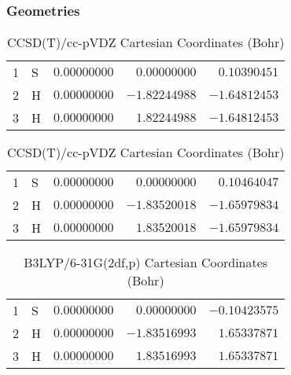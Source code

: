 \documentclass[10pt,oneside]{article}
\begin{document}
\clearpage

\subsection{}

\begin{table}[h!]
\subsubsection*{Geometries}
\begin{multicols}{2}
\centering
\caption{CCSD(T)/cc-pVTZ Cartesian Coordinates (Bohr)}
\begin{tabular}{llrrr}
\toprule
1  & S  & $ 0.00000000$ & $ 0.00000000$ & $ 0.10390451$ \\
2  & H  & $ 0.00000000$ & $-1.82244988$ & $-1.64812453$ \\
3  & H  & $ 0.00000000$ & $ 1.82244988$ & $-1.64812453$ \\
\bottomrule
\end{tabular}
\caption{CCSD(T)/cc-pVDZ Cartesian Coordinates (Bohr)}
\begin{tabular}{llrrr}
\toprule
1  & S  & $ 0.00000000$ & $ 0.00000000$ & $ 0.10464047$ \\
2  & H  & $ 0.00000000$ & $-1.83520018$ & $-1.65979834$ \\
3  & H  & $ 0.00000000$ & $ 1.83520018$ & $-1.65979834$ \\
\bottomrule
\end{tabular}
\end{multicols}
\end{table}

\begin{table}[h]
\centering
\caption{B3LYP/6-31G(2df,p) Cartesian Coordinates (Bohr)}
\begin{tabular}{llrrr}
\toprule
1  & S  & $ 0.00000000$ & $ 0.00000000$ & $-0.10423575$ \\
2  & H  & $ 0.00000000$ & $-1.83516993$ & $ 1.65337871$ \\
3  & H  & $ 0.00000000$ & $ 1.83516993$ & $ 1.65337871$ \\
\bottomrule
\end{tabular}
\end{table}
\end{document}
